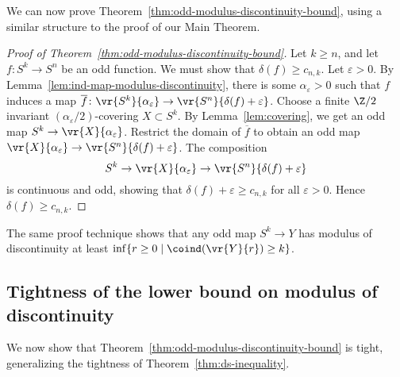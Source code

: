 \documentclass[11pt, reqno, english]{amsart}
\begin{document}
We can now prove Theorem~\ref{thm:odd-modulus-discontinuity-bound}, using a similar structure to the proof of our Main Theorem.

\begin{proof}[Proof of Theorem~\ref{thm:odd-modulus-discontinuity-bound}]
Let $k\ge n$, and let $f\colon S^k \to S^n$ be an odd function.
We must show that $\delta(f)\ge c_{n,k}$.
Let $\varepsilon>0$.
By Lemma~\ref{lem:ind-map-modulus-discontinuity}, there is some $\alpha_\varepsilon>0$ such that $f$ induces a map $\overline{f}\colon\vr{S^k}{\alpha_\varepsilon}\to \vr{S^n}{\delta(f)+ \varepsilon}$.
Choose a finite $\Z/2$ invariant $(\alpha_\varepsilon/2)$-covering $X\subset S^k$.
By Lemma~\ref{lem:covering}, we get an odd map $S^k\to \vr{X}{\alpha_\varepsilon}$.
Restrict the domain of $\overline{f}$ to obtain an odd map $\vr{X}{\alpha_\varepsilon}\to \vr{S^n}{\delta(f)+ \varepsilon}$.
The composition
\[ S^k\to \vr{X}{\alpha_\varepsilon} \to \vr{S^n}{\delta(f)+ \varepsilon}\]
is continuous and odd, showing that $\delta(f)+\varepsilon \ge c_{n,k}$ for all $\varepsilon > 0$.
Hence $\delta(f) \ge c_{n,k}$.
\end{proof}

\begin{remark}
\label{rem:odd-modulus-discontinuity-bound}
The same proof technique shows that any odd map $S^k \to Y$ has modulus of discontinuity at least $\inf\{r\ge 0 \mid \coind(\vr{Y}{r})\ge k\}$.
\end{remark}


\subsection{Tightness of the lower bound on modulus of discontinuity}
\label{ssec:lower-bound-tight}

We now show that Theorem~\ref{thm:odd-modulus-discontinuity-bound} is tight, generalizing the tightness of Theorem~\ref{thm:ds-inequality}.


\end{document}
